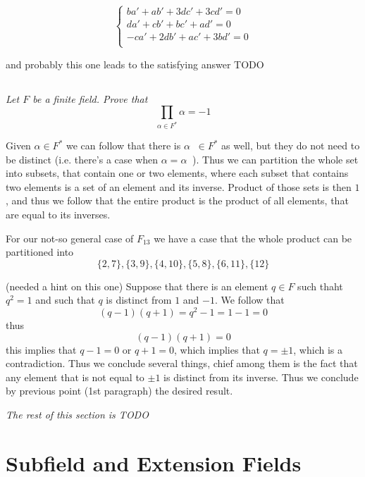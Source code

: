 \documentclass[11pt,oneside,titlepage]{book}
\DeclareMathOperator \inv {^{-1}}
\newcommand{\set}[1]{\{ #1 \}}
\begin{document}
$$
\begin{cases}
  b a' + a b' + 3d c' + 3c d' = 0 \\
  da' + cb' + bc' + ad' = 0 \\
  -ca' + 2db' + ac' + 3bd' = 0 \\
\end{cases}
$$

and probably this one leads to the satisfying answer TODO

\subsection{}

\textit{Let $F$ be a finite field. Prove that
  $$\prod_{\alpha \in F^*}{\alpha} = -1$$
}

Given $\alpha \in F^*$ we can follow that there is $\alpha\inv \in
F^*$ as well, but they do not need to be distinct (i.e. there's a case
when $\alpha = \alpha\inv$). Thus we can partition the whole set into
subsets, that contain one or two elements, where each subset that
contains two elements is a set of an element and its inverse.
Product of those sets is then $1$, and thus we follow that
the entire product is the product of all elements, that are equal
to its inverses.

For our not-so general case of $F_{13}$ we have a case that
the whole product can be partitioned into
$$\set{2, 7}, \set{3, 9}, \set{4, 10}, \set{5, 8},
\set{6, 11}, \set{12}$$

(needed a hint on this one)
Suppose that there is an element $q \in F$ such thaht $q^2 = 1$ and
such that $q$ is distinct from $1$ and $-1$. We follow that
$$(q - 1) (q + 1) = q^2 - 1 = 1 - 1 = 0$$
thus
$$(q - 1)( q + 1) = 0$$
this implies that $q - 1 = 0$ or $q + 1 = 0$, which implies that $q =
\pm 1$, which is a contradiction. Thus we conclude several things,
chief among them is the fact that any element that is not equal
to $\pm 1$ is distinct from its inverse. Thus we conclude by previous
point (1st paragraph) the desired result.

\textit{The rest of this section is TODO}

\section{Subfield and Extension Fields}

\subsection{}
\end{document}
